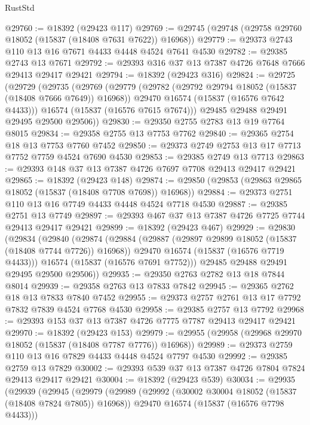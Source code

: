\begin{lexlean}{RustStd}
\begin{coremodule}
@29760 := @18392 (@29423 @117)
@29769 := @29745 (@29748 (@29758 @29760 @18052 (@15837 (@18408 @7631 @7622)) @16968))
@29779 := @29373 @2743 @110 @13 @16 @7671 @4433 @4448 @4524 @7641 @4530
@29782 := @29385 @2743 @13 @7671
@29792 := @29393 @316 @37 @13 @7387 @4726 @7648 @7666 @29413 @29417 @29421
@29794 := @18392 (@29423 @316)
@29824 := @29725
    (@29729
      (@29735
        (@29769
          (@29779
            (@29782 (@29792 @29794 @18052 (@15837 (@18408 @7666 @7649)) @16968))
            @29470
            @16574
            (@15837 (@16576 @7642 @4433)))
          @16574
          (@15837 (@16576 @7615 @7674)))
        @29485
        @29488
        @29491
        @29495
        @29500
        @29506))
@29830 := @29350 @2755 @2783 @13 @19 @7764 @8015
@29834 := @29358 @2755 @13 @7753 @7762
@29840 := @29365 @2754 @18 @13 @7753 @7760 @7452
@29850 := @29373 @2749 @2753 @13 @17 @7713 @7752 @7759 @4524 @7690 @4530
@29853 := @29385 @2749 @13 @7713
@29863 := @29393 @148 @37 @13 @7387 @4726 @7697 @7708 @29413 @29417 @29421
@29865 := @18392 (@29423 @148)
@29874 := @29850 (@29853 (@29863 @29865 @18052 (@15837 (@18408 @7708 @7698)) @16968))
@29884 := @29373 @2751 @110 @13 @16 @7749 @4433 @4448 @4524 @7718 @4530
@29887 := @29385 @2751 @13 @7749
@29897 := @29393 @467 @37 @13 @7387 @4726 @7725 @7744 @29413 @29417 @29421
@29899 := @18392 (@29423 @467)
@29929 := @29830
    (@29834
      (@29840
        (@29874
          (@29884
            (@29887 (@29897 @29899 @18052 (@15837 (@18408 @7744 @7726)) @16968))
            @29470
            @16574
            (@15837 (@16576 @7719 @4433)))
          @16574
          (@15837 (@16576 @7691 @7752)))
        @29485
        @29488
        @29491
        @29495
        @29500
        @29506))
@29935 := @29350 @2763 @2782 @13 @18 @7844 @8014
@29939 := @29358 @2763 @13 @7833 @7842
@29945 := @29365 @2762 @18 @13 @7833 @7840 @7452
@29955 := @29373 @2757 @2761 @13 @17 @7792 @7832 @7839 @4524 @7768 @4530
@29958 := @29385 @2757 @13 @7792
@29968 := @29393 @153 @37 @13 @7387 @4726 @7775 @7787 @29413 @29417 @29421
@29970 := @18392 (@29423 @153)
@29979 := @29955 (@29958 (@29968 @29970 @18052 (@15837 (@18408 @7787 @7776)) @16968))
@29989 := @29373 @2759 @110 @13 @16 @7829 @4433 @4448 @4524 @7797 @4530
@29992 := @29385 @2759 @13 @7829
@30002 := @29393 @539 @37 @13 @7387 @4726 @7804 @7824 @29413 @29417 @29421
@30004 := @18392 (@29423 @539)
@30034 := @29935
    (@29939
      (@29945
        (@29979
          (@29989
            (@29992 (@30002 @30004 @18052 (@15837 (@18408 @7824 @7805)) @16968))
            @29470
            @16574
            (@15837 (@16576 @7798 @4433)))

\end{coremodule}
\end{lexlean}
